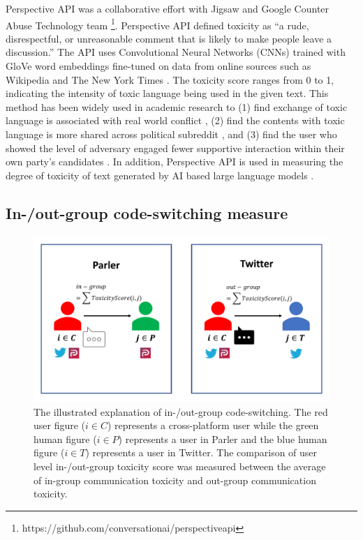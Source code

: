 \documentclass[Crown,sagev,times]{sagej}
\begin{document}
Perspective API was a collaborative effort with Jigsaw and Google Counter Abuse
Technology team {\footnote[4]{https://github.com/conversationai/perspectiveapi}}.
Perspective API defined toxicity as ``a rude, disrespectful, 
or unreasonable comment that is likely to make people leave a discussion.'' 
The API uses Convolutional Neural Networks (CNNs) trained with GloVe word embeddings
fine-tuned on data from online sources such as Wikipedia and The New York Times \cite{fortuna2020toxic}.
The toxicity score ranges from 0 to 1, indicating the intensity of toxic language being used 
in the given text. This method has been widely used in academic research
to (1) find exchange of toxic language 
is associated with real world conflict \cite{gallacher2021online}, 
(2) find the contents with toxic language is more shared across political subreddit
\cite{chipidza2021effect}, and (3) find the user who showed the level of adversary engaged 
fewer supportive interaction within their own party’s candidates \cite{hua2020characterizing}.  
In addition, Perspective API is used in measuring the degree of toxicity of text generated
by AI based large language models \cite{gehmanrealtoxicityprompts}.

\subsection{In-/out-group code-switching measure} \label{sec:within-platform}

\begin{figure}[htp]
    \centering
    \includegraphics[scale=0.3]{figure/within-platform-v4.pdf}
    \caption{The illustrated explanation of in-/out-group code-switching.
    The red user figure ($i \in C$) represents a cross-platform 
    user while the green human figure ($i \in P$) represents a user in 
    Parler and the blue human figure ($i \in T$) represents a user in Twitter. 
    The comparison of user level in-/out-group toxicity score was measured 
    between the average of in-group communication toxicity and out-group communication toxicity.}
    \label{fig:within-platform}
\end{figure}
\end{document}
